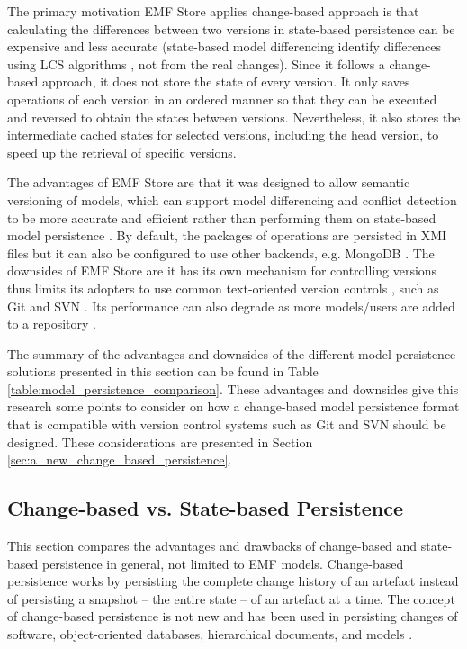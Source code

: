 The primary motivation EMF Store applies change-based approach is that calculating the differences between two versions in state-based persistence can be expensive and less accurate \cite{emfstore2019versioning} (state-based model differencing identify differences using LCS algorithms \cite{emfcompare2018developer,DBLP:journals/algorithmica/Meyers86}, not from the real changes). Since it follows a change-based approach, it does not store the state of every version. It only saves operations of each version in an ordered manner so that they can be executed and reversed to obtain the states between versions. Nevertheless, it also stores the intermediate cached states for selected versions, including the head version, to speed up the retrieval of specific versions.

The advantages of EMF Store are that it was designed to allow semantic versioning of models, which can support model differencing and conflict detection to be more accurate and efficient rather than performing them on state-based model persistence \cite{emfstore2019versioning}. By default, the packages of operations are persisted in XMI files but it can also be configured to use other backends, e.g. MongoDB \cite{emfstore2019mongodb}. The downsides of EMF Store are it has its own mechanism for controlling versions thus limits its adopters to use common text-oriented version controls \cite{emfstore2019getting}, such as Git and SVN . Its performance can also degrade as more models/users are added to a repository \cite{KolovosRMPGCLRV13}.

The summary of the advantages and downsides of the different model persistence solutions presented in this section can be found in Table \ref{table:model_persistence_comparison}. These advantages and downsides give this research some points to consider on how a change-based model persistence format that is compatible with version control systems such as Git and SVN should be designed. These considerations are presented in Section \ref{sec:a_new_change_based_persistence}.

\subsection{Change-based vs. State-based Persistence}
\label{sec:change_based_vs_state_based_persistence}
This section compares the advantages and drawbacks of change-based and state-based persistence in general, not limited to EMF models. Change-based persistence works by persisting the complete change history of an artefact instead of persisting a snapshot -- the entire state -- of an artefact at a time. The concept of change-based persistence is not new and has been used in persisting changes of software, object-oriented databases, hierarchical documents, and models 
\cite{DBLP:journals/entcs/RobbesL07,DBLP:conf/sde/LippeO92,DBLP:conf/caise/IgnatN05,koegel2010emfstore}. 

